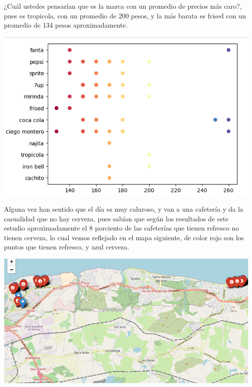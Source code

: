 \documentclass[a4paper,11pt]{article}
\begin{document}
\par\vspace{2pt}
¿Cuál ustedes pensarían que es la marca con un promedio de precios más caro?, pues es tropicola, con un promedio de 200 pesos, y la más barata es frised con un promedio de 134 pesos aproximadamente.
\par\vspace{2pt}
\begin{minipage}{0.5\textwidth}
  \begin{center}
    \includegraphics[width=1.4\textwidth]{marca y precio de refresco.png}
  \end{center}
\end{minipage}
\par\vspace{2pt}
Alguna vez han sentido que el día es muy caluroso, y van a una cafetería y da la casualidad que no hay cerveza, pues sabían que según los resultados de este estudio aproximadamente el 8 porciento de las cafeterías que tienen refresco no tienen cerveza, lo cual vemos reflejado en el mapa siguiente, de color rojo son los puntos que tienen refresco, y azul cerveza.
\par\vspace{2pt}
\begin{minipage}{0.5\textwidth}
  \begin{center}
    \includegraphics[width=1.4\textwidth]{mapa de cerveza y refresco.png}
  \end{center}
\end{minipage}
\end{document}
